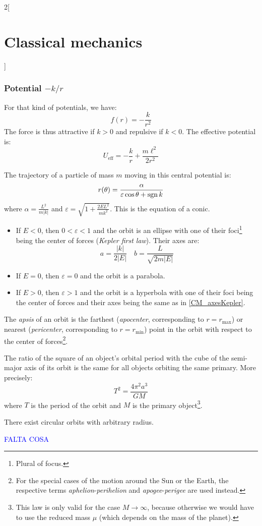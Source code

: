\documentclass[../../../main_physics.tex]{subfiles}
\begin{document}
\begin{multicols}{2}[\section{Classical mechanics}]
  \subsubsection{Potential \texorpdfstring{$-k/r$}{-k/r}}
  \begin{proposition}
    For that kind of potentials, we have: $$f(r)=-\frac{k}{r^2}$$
    The force is thus attractive if $k>0$ and repulsive if $k<0$. The effective potential is: $$U_\text{eff}=-\frac{k}{r}+\frac{m\ell^2}{2r^2}$$
  \end{proposition}
  \begin{theorem}
    The trajectory of a particle of mass $m$ moving in this central potential is: $$r(\theta)=\frac{\alpha}{\varepsilon\cos\theta+\operatorname{sgn} k}$$ where $\displaystyle\alpha=\frac{L^2}{m|k|}$ and $\displaystyle\varepsilon=\sqrt{1+\frac{2EL^2}{mk^2}}$. This is the equation of a conic.
    \begin{itemize}
      \item If $E<0$, then $0<\varepsilon<1$ and the orbit is an ellipse with one of their foci\footnote{Plural of focus.} being the center of forces (\emph{Kepler first law}). Their axes are:
            \begin{equation}\label{CM_axesKepler}
              a=\frac{|k|}{2|E|}\quad b=\frac{L}{\sqrt{2m|E|}}
            \end{equation}
      \item If $E=0$, then $\varepsilon=0$ and the orbit is a parabola.
      \item If $E>0$, then $\varepsilon>1$ and the orbit is a hyperbola with one of their foci being the center of forces and their axes being the same as in \cref{CM_axesKepler}.
    \end{itemize}
  \end{theorem}
  \begin{definition}
    The \emph{apsis} of an orbit is the farthest (\emph{apocenter}, corresponding to $r=r_\text{max}$) or nearest (\emph{pericenter}, corresponding to $r=r_\text{min}$) point in the orbit with respect to the center of forces\footnote{For the special cases of the motion around the Sun or the Earth, the respective terms \emph{aphelion}-\emph{perihelion} and \emph{apogee}-\emph{perigee} are used instead.}.
  \end{definition}
  \begin{law}
    The ratio of the square of an object's orbital period with the cube of the semi-major axis of its orbit is the same for all objects orbiting the same primary. More precisely: $$T^2=\frac{4\pi^2a^3}{GM}$$ where $T$ is the period of the orbit and $M$ is the primary object\footnote{This law is only valid for the case $M\to\infty$, because otherwise we would have to use the reduced mass $\mu$ (which depends on the mass of the planet).}.
  \end{law}
  \begin{theorem}
    There exist circular orbits with arbitrary radius.
  \end{theorem}
  \textcolor{blue}{FALTA COSA}

\end{multicols}
\end{document}
